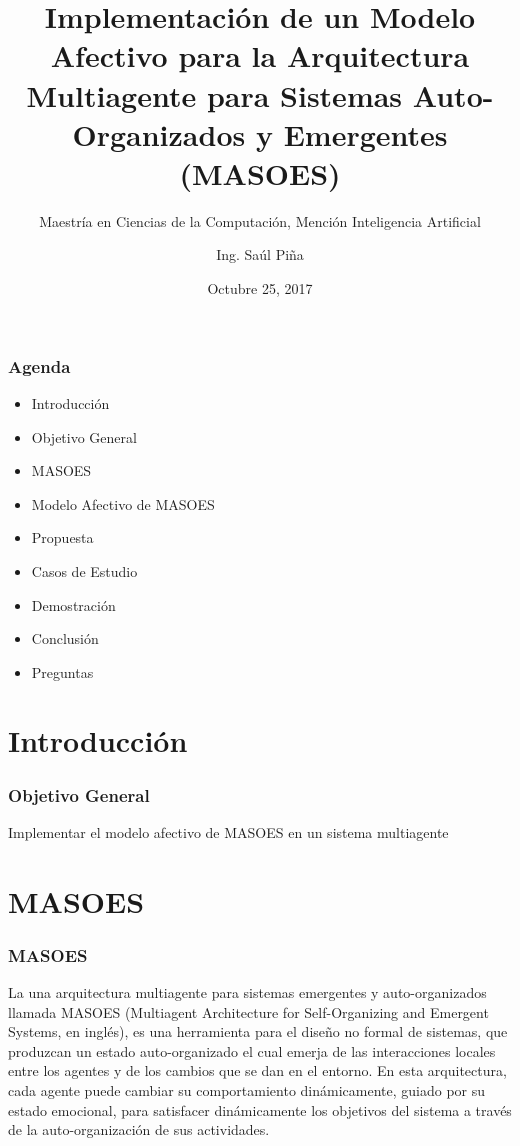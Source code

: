 \documentclass{beamer}
\title{Implementación de un Modelo Afectivo para la Arquitectura Multiagente para Sistemas Auto-Organizados y Emergentes (MASOES)}
\subtitle{Maestría en Ciencias de la Computación, Mención Inteligencia Artificial}
\author{Ing. Saúl Piña}
\date{Octubre 25, 2017}
\institute{\url{sauljabin@gmail.com}}
\begin{document}
\begin{frame}[plain,t]
\titlepage
\end{frame}

\begin{frame}
\frametitle{Agenda}
\begin{itemize}
\item Introducción
\item Objetivo General
\item MASOES
\item Modelo Afectivo de MASOES
\item Propuesta
\item Casos de Estudio
\item Demostración
\item Conclusión
\item Preguntas
\end{itemize}
\end{frame}

\section{Introducción}

\begin{frame}
\frametitle{Objetivo General}
\huge
Implementar el modelo afectivo de MASOES en un sistema multiagente
\end{frame}

\section{MASOES}

\begin{frame}
\frametitle{MASOES}
La una arquitectura multiagente para sistemas emergentes y auto-organizados llamada
MASOES (Multiagent Architecture for Self-Organizing and Emergent Systems, en inglés),
es una herramienta para el diseño no
formal de sistemas, que produzcan un estado auto-organizado el cual emerja de
las interacciones locales entre los agentes y de los cambios que se dan en el
entorno. En esta arquitectura, cada agente puede cambiar su comportamiento
dinámicamente, guiado por su estado emocional, para satisfacer dinámicamente los
objetivos del sistema a través de la auto-organización de sus actividades.
\end{frame}
\end{document}
